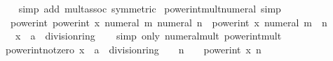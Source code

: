 \begin{isabellebody}
%
\isadelimproof
\ \ %
\endisadelimproof
%
\isatagproof
{}\isamarkupfalse%
\ {\isacharparenleft}{\kern0pt}simp\ add{\isacharcolon}{\kern0pt}\ mult{\isachardot}{\kern0pt}assoc\ {\isacharbrackleft}{\kern0pt}symmetric{\isacharbrackright}{\kern0pt}{\isacharparenright}{\kern0pt}%
\endisatagproof
{\isafoldproof}%
%
\isadelimproof
\isanewline
%
\endisadelimproof
\isanewline
{}\isamarkupfalse%
\ power{\isacharunderscore}{\kern0pt}int{\isacharunderscore}{\kern0pt}mult{\isacharunderscore}{\kern0pt}numeral\ {\isacharbrackleft}{\kern0pt}simp{\isacharbrackright}{\kern0pt}{\isacharcolon}{\kern0pt}\isanewline
\ \ {\isachardoublequoteopen}power{\isacharunderscore}{\kern0pt}int\ {\isacharparenleft}{\kern0pt}power{\isacharunderscore}{\kern0pt}int\ x\ {\isacharparenleft}{\kern0pt}numeral\ m{\isacharparenright}{\kern0pt}{\isacharparenright}{\kern0pt}\ {\isacharparenleft}{\kern0pt}numeral\ n{\isacharparenright}{\kern0pt}\ {\isacharequal}{\kern0pt}\ power{\isacharunderscore}{\kern0pt}int\ x\ {\isacharparenleft}{\kern0pt}numeral\ {\isacharparenleft}{\kern0pt}m\ {\isacharasterisk}{\kern0pt}\ n{\isacharparenright}{\kern0pt}{\isacharparenright}{\kern0pt}{\isachardoublequoteclose}\isanewline
\ \ \ x\ {\isacharcolon}{\kern0pt}{\isacharcolon}{\kern0pt}\ {\isachardoublequoteopen}{\isacharprime}{\kern0pt}a\ {\isacharcolon}{\kern0pt}{\isacharcolon}{\kern0pt}\ division{\isacharunderscore}{\kern0pt}ring{\isachardoublequoteclose}\isanewline
%
\isadelimproof
\ \ %
\endisadelimproof
%
\isatagproof
{}\isamarkupfalse%
\ {\isacharparenleft}{\kern0pt}simp\ only{\isacharcolon}{\kern0pt}\ numeral{\isacharunderscore}{\kern0pt}mult\ power{\isacharunderscore}{\kern0pt}int{\isacharunderscore}{\kern0pt}mult{\isacharparenright}{\kern0pt}%
\endisatagproof
{\isafoldproof}%
%
\isadelimproof
\isanewline
%
\endisadelimproof
\ \ \isanewline
{}\isamarkupfalse%
\ power{\isacharunderscore}{\kern0pt}int{\isacharunderscore}{\kern0pt}not{\isacharunderscore}{\kern0pt}zero{\isacharcolon}{\kern0pt}\ {\isachardoublequoteopen}{\isacharparenleft}{\kern0pt}x\ {\isacharcolon}{\kern0pt}{\isacharcolon}{\kern0pt}\ {\isacharprime}{\kern0pt}a\ {\isacharcolon}{\kern0pt}{\isacharcolon}{\kern0pt}\ division{\isacharunderscore}{\kern0pt}ring{\isacharparenright}{\kern0pt}\ {\isasymnoteq}\ {}\ {\isasymor}\ n\ {\isacharequal}{\kern0pt}\ {}\ {\isasymLongrightarrow}\ power{\isacharunderscore}{\kern0pt}int\ x\ n\ {\isasymnoteq}\ {}{\isachardoublequoteclose}\isanewline
%
\isadelimproof
\ \ %
\endisadelimproof
%
\isatagproof
{}\isamarkupfalse%

\end{isabellebody}

